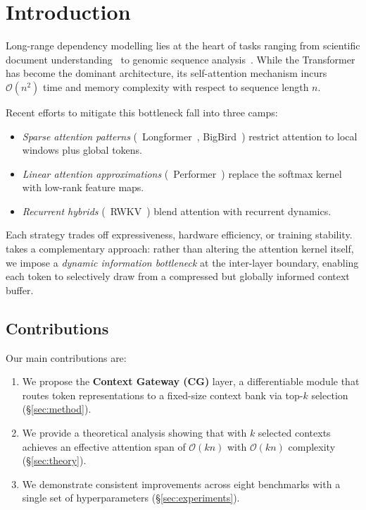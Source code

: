 \section{Introduction}
\label{sec:intro}

Long-range dependency modelling lies at the heart of tasks ranging from
scientific document understanding~\cite{lo2020s2orc} to genomic sequence
analysis~\cite{ji2021dnabert}. While the Transformer~\cite{vaswani2017attention}
has become the dominant architecture, its self-attention mechanism incurs
$\mathcal{O}(n^2)$ time and memory complexity with respect to sequence length $n$.

Recent efforts to mitigate this bottleneck fall into three camps:
\begin{itemize}
  \item \emph{Sparse attention patterns} (\eg~Longformer~\cite{beltagy2020longformer},
        BigBird~\cite{zaheer2020bigbird}) restrict attention to local windows plus
        global tokens.
  \item \emph{Linear attention approximations} (\eg~Performer~\cite{choromanski2020rethinking})
        replace the softmax kernel with low-rank feature maps.
  \item \emph{Recurrent hybrids} (\eg~RWKV~\cite{peng2023rwkv}) blend attention
        with recurrent dynamics.
\end{itemize}

Each strategy trades off expressiveness, hardware efficiency, or training
stability. \modelname{} takes a complementary approach: rather than altering the
attention kernel itself, we impose a \emph{dynamic information bottleneck} at the
inter-layer boundary, enabling each token to selectively draw from a compressed
but globally informed context buffer.

\subsection{Contributions}

Our main contributions are:

\begin{enumerate}[label=\textbf{\arabic*.}]
  \item We propose the \textbf{Context Gateway (CG)} layer, a differentiable
        module that routes token representations to a fixed-size context bank via
        top-$k$ selection (\S\ref{sec:method}).
  \item We provide a theoretical analysis showing that \modelname{} with $k$
        selected contexts achieves an effective attention span of
        $\mathcal{O}(kn)$ with $\mathcal{O}(kn)$ complexity (\S\ref{sec:theory}).
  \item We demonstrate consistent improvements across eight benchmarks with a
        single set of hyperparameters (\S\ref{sec:experiments}).
\end{enumerate}

